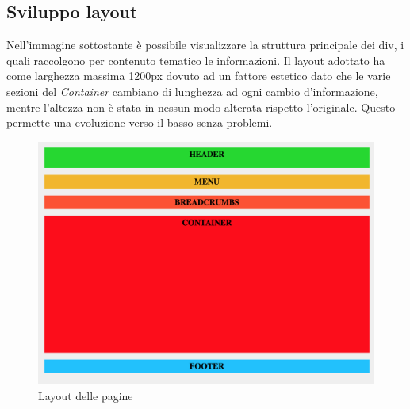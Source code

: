 \documentclass[11pt]{article}
\begin{document}
\subsection{Sviluppo layout}

Nell'immagine sottostante è possibile visualizzare la struttura principale dei div, i quali raccolgono per contenuto tematico le informazioni.
Il layout adottato ha come larghezza massima 1200px dovuto ad un fattore estetico dato che le varie sezioni del \textit{Container} cambiano di lunghezza ad ogni cambio d'informazione, mentre l'altezza non è stata in nessun modo alterata rispetto l'originale. Questo permette una evoluzione verso il basso senza problemi.
\begin{figure}[H]	
	\centering
	\includegraphics[width=\linewidth]{layout.png}
	\caption{Layout delle pagine}
	\label{Layout delle pagine}
\end{figure}
\end{document}

